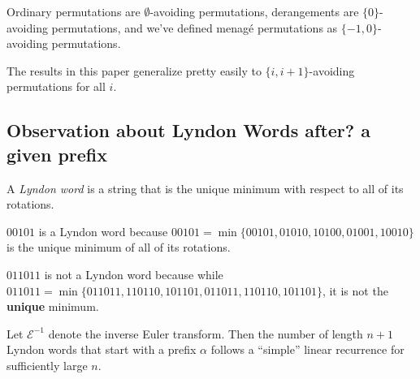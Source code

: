 \begin{example}
  Ordinary permutations are $\emptyset$-avoiding permutations,
  derangements are $\{0\}$-avoiding permutations, and
  we've defined menag\'e permutations as $\{-1,0\}$-avoiding permutations.

  The results in this paper generalize pretty easily to $\{i,i+1\}$-avoiding
  permutations for all $i$.
\end{example}

\subsection{Observation about Lyndon Words after? a given prefix}
\begin{definition}
  A \textit{Lyndon word} is a string that is the unique minimum with respect
  to all of its rotations.
\end{definition}
\begin{example}
  $00101$ is a Lyndon word because
  $00101 = \min\{00101, 01010, 10100, 01001, 10010\}$ is the unique minimum of
  all of its rotations.

  $011011$ is not a Lyndon word because while $011011 = \min\{011011, 110110, 101101, 011011, 110110, 101101\}$,
  it is not the \textbf{unique} minimum.
\end{example}
\begin{conjecture}
  Let $\mathcal{E}^{-1}$ denote the inverse Euler transform.
  Then the number of length $n+1$ Lyndon words that start with a prefix
  $\alpha$ follows a ``simple'' linear recurrence for sufficiently large $n$.
\end{conjecture}
